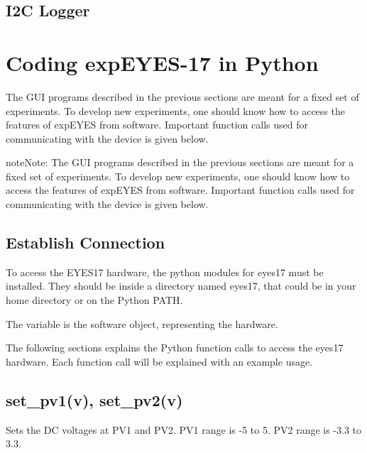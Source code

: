 \documentclass[a4paper,12pt,english]{sphinxmanual}
\begin{document}
\section{I2C Logger}
\label{\detokenize{6.93:i2c-logger}}\label{\detokenize{6.93::doc}}

\chapter{Coding expEYES-17 in Python}
\label{\detokenize{index:coding-expeyes-17-in-python}}
The GUI programs described in the previous sections are meant for a
fixed set of experiments. To develop new experiments, one should know
how to access the features of expEYES from software. Important function
calls used for communicating with the device is given below.

\begin{sphinxadmonition}{note}{Note:}
The GUI programs described in the previous sections are meant for a
fixed set of experiments. To develop new experiments, one should know
how to access the features of expEYES from software. Important function
calls used for communicating with the device is given below.
\end{sphinxadmonition}


\section{Establish Connection}
\label{\detokenize{7.1:establish-connection}}\label{\detokenize{7.1::doc}}
To access the EYES17 hardware, the python modules for eyes17 must be
installed. They should be inside a directory named eyes17, that could be
in your home directory or on the Python PATH. 

\begin{sphinxVerbatim}[commandchars=\\\{\}]
 
  
\end{sphinxVerbatim}

The variable  is the software object, representing the hardware.

The following sections explains the Python function calls to access the
eyes17 hardware. Each function call will be explained with an example
usage.


\section{set\_pv1(v), set\_pv2(v)}
\label{\detokenize{7.1:set-pv1-v-set-pv2-v}}
Sets the DC voltages at PV1 and PV2. PV1 range is -5 to 5. PV2 range is
-3.3 to 3.3.
\end{document}
